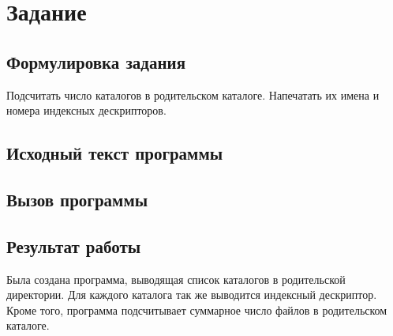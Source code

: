 \documentclass[a4paper,14pt]{article}
\begin{document}


\tableofcontents
\pagebreak

\section{Задание}

\subsection{Формулировка задания}
Подсчитать число каталогов в родительском каталоге.
Напечатать их имена и номера индексных дескрипторов.

\subsection{Исходный текст программы}
{\small }
\subsection{Вызов программы}
{\small }

\subsection{Результат работы}
Была создана программа, выводящая список каталогов в родительской директории.
Для каждого каталога так же выводится индексный дескриптор.
Кроме того, программа подсчитывает суммарное число файлов в родительском каталоге.
\end{document}
